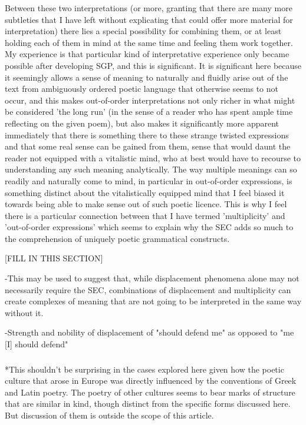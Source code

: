 \documentclass[]{article}
\begin{document}
Between these two interpretations (or more, granting that there are many more subtleties that I have left without explicating that could offer more material for interpretation) there lies a special possibility for combining them, or at least holding each of them in mind at the same time and feeling them work together. My experience is that particular kind of interpretative experience only became possible after developing SGP, and this is significant. It is significant here because it seemingly allows a sense of meaning to naturally and fluidly arise out of the text from ambiguously ordered poetic language that otherwise seems to not occur, and this makes out-of-order interpretations not only richer in what might be considered 'the long run' (in the sense of a reader who has spent ample time reflecting on the given poem), but also makes it significantly more apparent immediately that there is something there to these strange twisted expressions and that some real sense can be gained from them, sense that would daunt the reader not  equipped with a vitalistic mind, who at best would have to recourse to understanding any such meaning analytically. The way multiple meanings can so readily and naturally come to mind, in particular in out-of-order expressions, is something distinct about the vitalistically equipped mind that I feel biased it towards being able to make sense out of such poetic licence. This is why I feel there is a particular connection between that I have termed 'multiplicity' and 'out-of-order expressions' which seems to explain why the SEC adds so much to the comprehension of uniquely poetic grammatical constructs.


[FILL IN THIS SECTION]



-This may be used to suggest that, while displacement phenomena alone may not necessarily require the SEC, combinations of displacement and multiplicity can create complexes of meaning that are not going to be interpreted in the same way without it.


-Strength and nobility of displacement of "should defend me" as opposed to "me [I] should defend"



\subsubsection{}



*This shouldn't be surprising in the cases explored here given how the poetic culture that arose in Europe was directly influenced by the conventions of Greek and Latin poetry. The poetry of other cultures seems to bear marks of structure that are similar in kind, though distinct from the specific forms discussed here. But discussion of them is outside the scope of this article.
\end{document}
